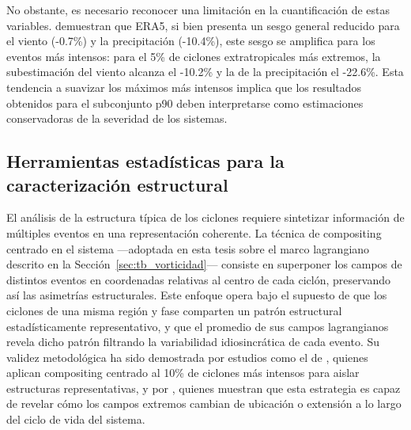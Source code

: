 No obstante, es necesario reconocer una limitación en la cuantificación de estas variables. \citet{chen2024evaluation} demuestran que ERA5, si bien presenta un sesgo general reducido para el viento (-0.7\%) y la precipitación (-10.4\%), este sesgo se amplifica para los eventos más intensos: para el 5\% de ciclones extratropicales más extremos, la subestimación del viento alcanza el -10.2\% y la de la precipitación el -22.6\%. Esta tendencia a suavizar los máximos más intensos implica que los resultados obtenidos para el subconjunto p90 deben interpretarse como estimaciones conservadoras de la severidad de los sistemas.

\subsection{Herramientas estadísticas para la caracterización estructural}\label{subsec:tb_herramientas}

El análisis de la estructura típica de los ciclones requiere sintetizar información de múltiples eventos en una representación coherente. La técnica de compositing centrado en el sistema —adoptada en esta tesis sobre el marco lagrangiano descrito en la Sección~\ref{sec:tb_vorticidad}— consiste en superponer los campos de distintos eventos en coordenadas relativas al centro de cada ciclón, preservando así las asimetrías estructurales. Este enfoque opera bajo el supuesto de que los ciclones de una misma región y fase comparten un patrón estructural estadísticamente representativo, y que el promedio de sus campos lagrangianos revela dicho patrón filtrando la variabilidad idiosincrática de cada evento. Su validez metodológica ha sido demostrada por estudios como el de \citet{priestley2022improved}, quienes aplican compositing centrado al 10\% de ciclones más intensos para aislar estructuras representativas, y por \citet{han2025system}, quienes muestran que esta estrategia es capaz de revelar cómo los campos extremos cambian de ubicación o extensión a lo largo del ciclo de vida del sistema.

